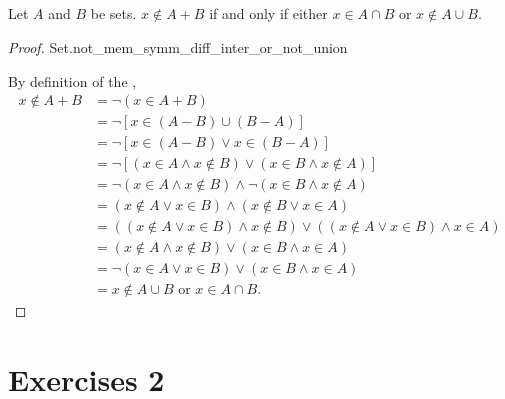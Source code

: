 \documentclass{report}
\begin{document}
\subsection{}

Let $A$ and $B$ be sets. $x \not\in A + B$ if and only if either
  $x \in A \cap B$ or $x \not\in A \cup B$.

\begin{proof}

    {Set.not\_mem\_symm\_diff\_inter\_or\_not\_union}

  By definition of the ,
    \begin{align*}
      x \not\in A + B
        & = \neg(x \in A + B) \\
        & = \neg[x \in (A - B) \cup (B - A)] \\
        & = \neg[x \in (A - B) \lor x \in (B - A)] \\
        & = \neg[(x \in A \land x \not\in B) \lor
          (x \in B \land x \not\in A)] \\
        & = \neg(x \in A \land x \not\in B) \land
          \neg(x \in B \land x \not\in A) \\
        & = (x \not\in A \lor x \in B) \land (x \not\in B \lor x \in A) \\
        & = ((x \not\in A \lor x \in B) \land x \not\in B) \lor
          ((x \not\in A \lor x \in B) \land x \in A) \\
        & = (x \not\in A \land x \not\in B) \lor (x \in B \land x \in A) \\
        & = \neg(x \in A \lor x \in B) \lor (x \in B \land x \in A) \\
        & = x \not\in A \cup B \text{ or } x \in A \cap B.
    \end{align*}

\end{proof}

\section{Exercises 2}%

\subsection{}%
\end{document}
